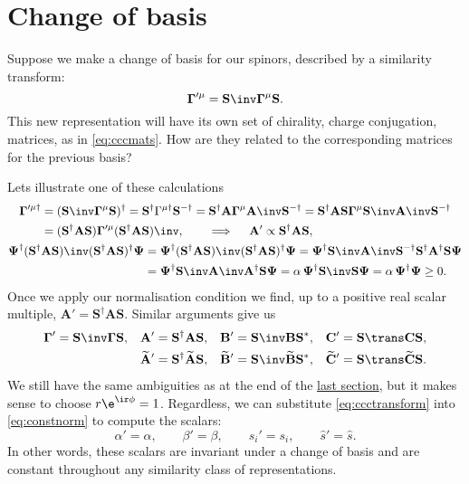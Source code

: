\documentclass[11pt]{article}
\newcommand{\invd}{^{-\dag}}
\newcommand{\Gammab}{\boldsymbol{\Gamma}}
\newcommand{\mud}{{\mu\dag}}
\renewcommand{\S}{\mathbf{S}}
\newcommand{\A}{\mathbf{A}}
\newcommand{\B}{\mathbf{B}}
\renewcommand{\C}{\mathbf{C}}
\newcommand{\At}{\widetilde{\A}}
\newcommand{\Bt}{\widetilde{\B}}
\newcommand{\Ct}{\widetilde{\C}}
\newcommand{\Psib}{\boldsymbol{\Psi}}
\begin{document}

\section{Change of basis}\label{sec:basis}

Suppose we make a change of basis for our spinors, described by a similarity transform:
%
\begin{equation*}
  \Gammab'^{\mu} = \S\inv \Gammab^\mu \S.
\end{equation*}
%
This new representation will have its own set of chirality, charge conjugation, \etc matrices, as in \cref{eq:cccmats}.
How are they related to the corresponding matrices for the previous basis?

Lets illustrate one of these calculations
%
\begin{equation*}
\begin{gathered}
\begin{aligned}
  \Gammab'^\mud
    &= (\S\inv \Gammab^\mu \S)^\dag
    = \S^\dag \Gamma^\mud \S\invd
    = \S^\dag \A \Gammab^\mu \A\inv \S\invd
    = \S^\dag \A \S \Gammab^\mu \S\inv \A\inv \S\invd \\
    &= (\S^\dag \A \S) \Gammab'^\mu (\S^\dag \A \S)\inv,
    \qquad \implies \quad
    \A' \propto \S^\dag \A \S,
\end{aligned}
\\
\begin{aligned}
  \Psib^\dag (\S^\dag \A \S)\inv (\S^\dag \A \S)^\dag \Psib
    &= \Psib^\dag (\S^\dag \A \S)\inv (\S^\dag \A \S)^\dag \Psib
     = \Psib^\dag \S\inv \A\inv \S\invd \S^\dag \A^\dag \S \Psib \\
    &= \Psib^\dag \S\inv \A\inv \A^\dag \S \Psib
     = \alpha\, \Psib^\dag \S\inv \S \Psib
     = \alpha\, \Psib^\dag \Psib
     \geq 0.
\end{aligned}
\end{gathered}
\end{equation*}
%
Once we apply our normalisation condition we find, up to a positive real scalar multiple,
\( \A' = \S^\dag \A \S \).
Similar arguments give us
%
\begin{equation}\label{eq:ccctransform}
\begin{aligned}
  \Gammab' &= \S\inv \Gammab \S, &
  \A' &= \S^\dag \A \S, &
  \B' &= \S\inv \B \S^\ast, &
  \C' &= \S\trans \C \S,
\\ &&
  \At' &= \S^\dag \At \S, &
  \Bt' &= \S\inv \Bt \S^\ast, &
  \Ct' &= \S\trans \Ct \S.
\end{aligned}
\end{equation}
%
We still have the same ambiguities as at the end of the \hyperref[eq:constnorm]{last section}, but it makes sense to choose \( r \e^{\ir\phi} = 1 \).
Regardless, we can substitute \cref{eq:ccctransform} into \cref{eq:constnorm} to compute the scalars:
%
\begin{equation*}
  \alpha' = \alpha, \qquad
  \beta' = \beta, \qquad
  s_i' = s_i, \qquad
  \hat{s}' = \hat{s}.
\end{equation*}
%
In other words, these scalars are invariant under a change of basis and are constant throughout any similarity class of representations.
\end{document}

